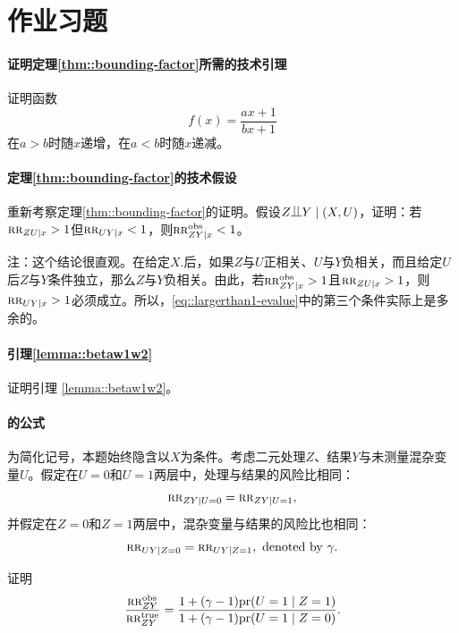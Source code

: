\section{作业习题}


\paragraph{证明定理\ref{thm::bounding-factor}所需的技术引理}
\label{hw::technical-for-evalue-increasing}

证明函数
$$
f(x) = \frac{ax+1}{bx+1}
$$
在$a>b$时随$x$递增，在$a<b$时随$x$递减。 


\paragraph{定理\ref{thm::bounding-factor}的技术假设}
\label{hw::technical-largerthan1}

重新考察定理\ref{thm::bounding-factor}的证明。假设$Z\ind Y \mid (X, U)$，证明：若$ \textsc{rr}_{ZU\mid x} > 1$但$ \textsc{rr}_{UY\mid x} < 1$，则$\textsc{rr}_{ZY\mid x}^{\textup{obs}} < 1$。 


注：这个结论很直观。在给定$X.$后，如果$Z$与$U$正相关、$U$与$Y$负相关，而且给定$U$后$Z$与$Y$条件独立，那么$Z$与$Y$负相关。由此，若$\textsc{rr}_{ZY\mid x}^{\textup{obs}} > 1$且$ \textsc{rr}_{ZU\mid x} > 1$，则$ \textsc{rr}_{UY\mid x} > 1$必须成立。所以，\eqref{eq::largerthan1-evalue}中的第三个条件实际上是多余的。 



\paragraph{引理\ref{lemma::betaw1w2}}\label{hw::proof-lemma-evalue}

证明引理 \ref{lemma::betaw1w2}。

\paragraph{\citet{Schlesselman::1978}的公式}\label{hw::Schlesselman1978formula}

为简化记号，本题始终隐含以$X$为条件。考虑二元处理$Z$、结果$Y$与未测量混杂变量$U$。假定在$U=0$和$U=1$两层中，处理与结果的风险比相同：
$$
 \textsc{rr}_{ZY|U=0} = \textsc{rr}_{ZY|U=1}, 
$$
并假定在$Z=0$和$Z=1$两层中，混杂变量与结果的风险比也相同：
$$  
\textsc{rr}_{UY|Z=0} = \textsc{rr}_{UY|Z=1} , \text{ denoted by }\gamma.
$$

证明
$$
\frac{\textsc{rr}_{ZY}^{\textup{obs}}}{  \textsc{rr}_{ZY}^{\textup{true}} } = \frac{1 + (  \gamma  -1)\textup{pr}(U=1\mid Z=1)  }
{ 1 + (  \gamma -1)\textup{pr}(U=1\mid Z=0) } .
$$ 




